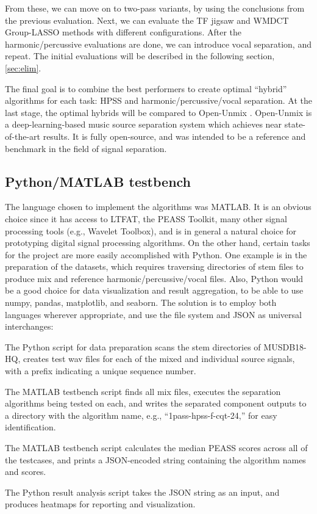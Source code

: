 \documentclass[letter,12pt]{article}
\newenvironment{tight_enumerate}{
\begin{enumerate}
  \setlength{\itemsep}{0pt}
  \setlength{\parskip}{0pt}
}{\end{enumerate}}
\begin{document}
From these, we can move on to two-pass variants, by using the conclusions from the previous evaluation. Next, we can evaluate the TF jigsaw and WMDCT Group-LASSO methods with different configurations. After the harmonic/percussive evaluations are done, we can introduce vocal separation, and repeat. The initial evaluations will be described in the following section, \ref{sec:elim}.

The final goal is to combine the best performers to create optimal ``hybrid'' algorithms for each task: HPSS and harmonic/percussive/vocal separation. At the last stage, the optimal hybrids will be compared to Open-Unmix \cite{umx}. Open-Unmix is a deep-learning-based music source separation system which achieves near state-of-the-art results. It is fully open-source, and was intended to be a reference and benchmark in the field of signal separation.

\subsection{Python/MATLAB testbench}

The language chosen to implement the algorithms was MATLAB. It is an obvious choice since it has access to LTFAT, the PEASS Toolkit, many other signal processing tools (e.g., Wavelet Toolbox), and is in general a natural choice for prototyping digital signal processing algorithms. On the other hand, certain tasks for the project are more easily accomplished with Python. One example is in the preparation of the datasets, which requires traversing directories of stem files to produce mix and reference harmonic/percussive/vocal files. Also, Python would be a good choice for data visualization and result aggregation, to be able to use numpy\cite{numpy}, pandas\cite{pandas}, matplotlib\cite{matplotlib}, and seaborn\cite{seaborn}. The solution is to employ both languages wherever appropriate, and use the file system and JSON as universal interchanges:
\begin{tight_enumerate}
\item
	The Python script for data preparation scans the stem directories of MUSDB18-HQ, creates test wav files for each of the mixed and individual source signals, with a prefix indicating a unique sequence number.
\item
	The MATLAB testbench script finds all mix files, executes the separation algorithms being tested on each, and writes the separated component outputs to a directory with the algorithm name, e.g., ``1pass-hpss-f-cqt-24,'' for easy identification.
\item
	The MATLAB testbench script calculates the median PEASS scores across all of the testcases, and prints a JSON-encoded string containing the algorithm names and scores.
\item
	The Python result analysis script takes the JSON string as an input, and produces heatmaps for reporting and visualization.
\end{tight_enumerate}
\end{document}
